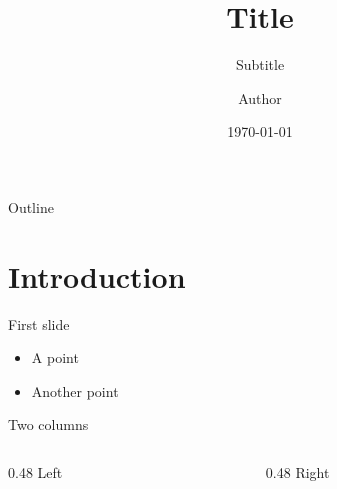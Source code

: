 \documentclass[aspectratio=169]{beamer}
\title{Title}
\subtitle{Subtitle}
\author{Author}
\date{\today}
\begin{document}
\begin{frame}
  \titlepage
\end{frame}

\begin{frame}{Outline}
  \tableofcontents
\end{frame}

\section{Introduction}

\begin{frame}{First slide}
  \begin{itemize}
    \item A point
    \item Another point
  \end{itemize}
\end{frame}

\begin{frame}{Two columns}
  \begin{columns}
    \begin{column}{0.48\textwidth}
      Left
    \end{column}
    \begin{column}{0.48\textwidth}
      Right
    \end{column}
  \end{columns}
\end{frame}
\end{document}
